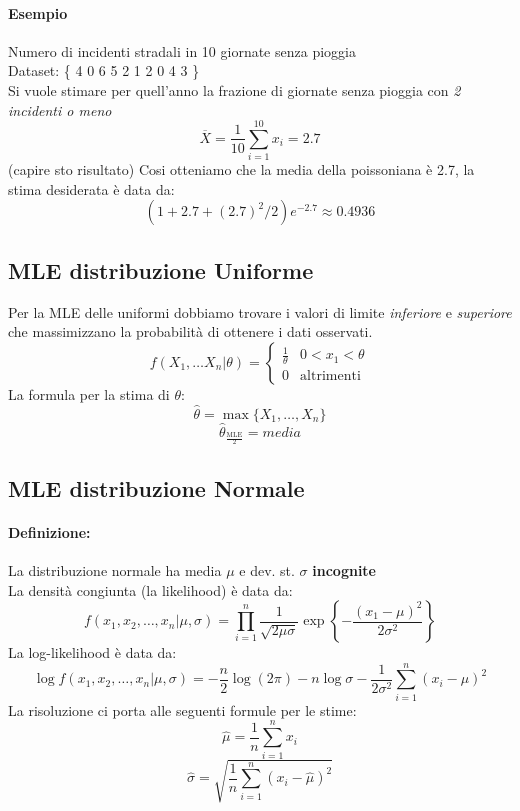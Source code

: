 \documentclass[]{article}
\newcommand{\definizione}{\paragraph{Definizione:}}
\begin{document}
    \paragraph{Esempio} Numero di incidenti stradali in 10 giornate senza pioggia \\
    Dataset: \{ 4 0 6 5 2 1 2 0 4 3 \} \\
    Si vuole stimare per quell'anno la frazione di giornate senza pioggia con \textit{2 incidenti o meno}
    \[ \overline{X} = \frac{1}{10} \sum_{i = 1}^{10} x_i = \boldsymbol{2.7} \]
    (capire sto risultato) Cosi otteniamo che la media della poissoniana è 2.7, la stima desiderata è data da:
    \[ (1+2.7+ (2.7)^2 /2 ) e^{-2.7} \approx 0.4936 \]
    \subsection{MLE distribuzione Uniforme}
    Per la MLE delle uniformi dobbiamo trovare i valori di limite \textit{inferiore} e \textit{superiore} che massimizzano la probabilità di ottenere i dati osservati.
    \begin{equation*}
        f(X_1, \ldots X_n \rvert \theta) =
        \begin{cases}
            \frac{1}{\theta} & 0 < x_1 < \theta \\
            0 & \text{altrimenti}
        \end{cases}
    \end{equation*}
    La formula per la stima di $\theta$:
    \[ \hat{\theta} = \max \{ X_1, \ldots, X_n \} \]
    $$ \hat{\theta}_{\frac{\text{MLE}}{2}} = \textit{media} $$
    \subsection{MLE distribuzione Normale } 
    \definizione La distribuzione normale ha media $\mu$ e dev. st. $\sigma$ \textbf{incognite} \\
    La densità congiunta (la likelihood) è data da:
    \[ f(x_1, x_2, \ldots, x_n \rvert \mu, \sigma) = \prod_{i= 1}^{n} \frac{1}{\sqrt{2 \mu \sigma}} \exp \left \{ - \frac{(x_1-\mu)^2}{2 \sigma^2} \right \} \]
    La log-likelihood è data da:
    \[ \log f(x_1, x_2, \ldots, x_n \rvert \mu, \sigma) = - \frac{n}{2} \log(2\pi) - n \log \sigma - \frac{1}{2\sigma^2} \sum_{i = 1}^{n} (x_i - \mu)^2 \]
    La risoluzione ci porta alle seguenti formule per le stime:
    \[ \hat{\mu} = \frac{1}{n} \sum_{i = 1}^{n} x_i \]
    \[ \hat{\sigma} = \sqrt{\frac{1}{n} \sum_{i = 1}^{n}(x_i - \hat{\mu})^2 } \]
\end{document}
